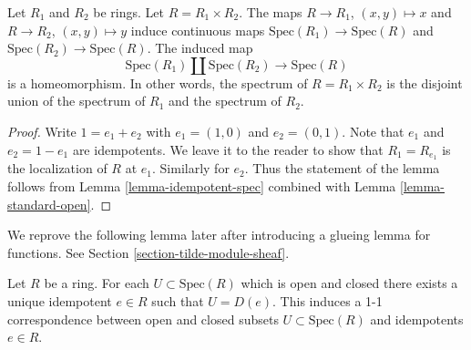 \begin{lemma}
\label{lemma-spec-product}
Let $R_1$ and $R_2$ be rings.
Let $R = R_1 \times R_2$.
The maps $R \to R_1$, $(x, y) \mapsto x$ and $R \to R_2$,
$(x, y) \mapsto y$
induce continuous maps $\text{Spec}(R_1) \to \text{Spec}(R)$ and
$\text{Spec}(R_2) \to \text{Spec}(R)$.
The induced map
$$
\text{Spec}(R_1) \coprod \text{Spec}(R_2)
\longrightarrow
\text{Spec}(R)
$$
is a homeomorphism. In other words,
the spectrum of $R = R_1\times R_2$ is the
disjoint union of the spectrum of $R_1$ and the
spectrum of $R_2$.
\end{lemma}

\begin{proof}
Write $1 = e_1 + e_2$ with $e_1 = (1, 0)$ and $e_2 = (0, 1)$.
Note that $e_1$ and $e_2 = 1 - e_1$ are idempotents.
We leave it to the reader to show that
$R_1 = R_{e_1}$ is the localization of $R$ at $e_1$.
Similarly for $e_2$.
Thus the statement of the lemma follows from Lemma
\ref{lemma-idempotent-spec} combined with Lemma
\ref{lemma-standard-open}.
\end{proof}

\noindent
We reprove the following lemma later after introducing
a glueing lemma for functions. See Section
\ref{section-tilde-module-sheaf}.

\begin{lemma}
\label{lemma-disjoint-decomposition}
Let $R$ be a ring. For each $U \subset \text{Spec}(R)$
which is open and closed
there exists a unique idempotent $e \in R$ such that
$U = D(e)$. This induces a 1-1 correspondence between
open and closed subsets $U \subset \text{Spec}(R)$ and
idempotents $e \in R$.
\end{lemma}

